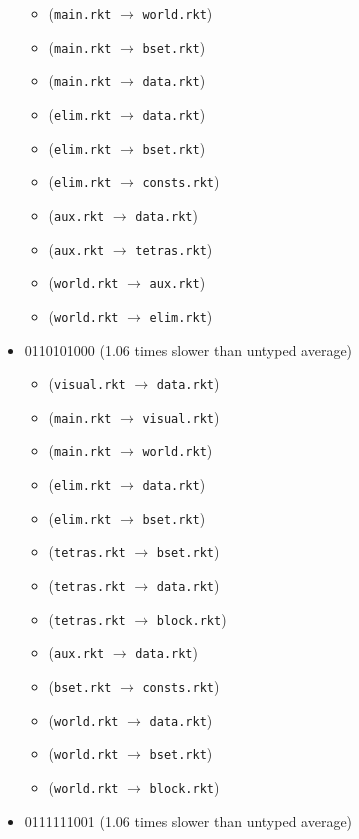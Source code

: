 \documentclass{article}
\newcommand{\mono}[1]{\texttt{#1}}
\begin{document}
\begin{itemize}
\begin{itemize}
  \item (\mono{main.rkt} $\rightarrow$ \mono{world.rkt})
  \item (\mono{main.rkt} $\rightarrow$ \mono{bset.rkt})
  \item (\mono{main.rkt} $\rightarrow$ \mono{data.rkt})
  \item (\mono{elim.rkt} $\rightarrow$ \mono{data.rkt})
  \item (\mono{elim.rkt} $\rightarrow$ \mono{bset.rkt})
  \item (\mono{elim.rkt} $\rightarrow$ \mono{consts.rkt})
  \item (\mono{aux.rkt} $\rightarrow$ \mono{data.rkt})
  \item (\mono{aux.rkt} $\rightarrow$ \mono{tetras.rkt})
  \item (\mono{world.rkt} $\rightarrow$ \mono{aux.rkt})
  \item (\mono{world.rkt} $\rightarrow$ \mono{elim.rkt})
  \end{itemize}
\item 0110101000 (1.06 times slower than untyped average)
  \begin{itemize}
  \item (\mono{visual.rkt} $\rightarrow$ \mono{data.rkt})
  \item (\mono{main.rkt} $\rightarrow$ \mono{visual.rkt})
  \item (\mono{main.rkt} $\rightarrow$ \mono{world.rkt})
  \item (\mono{elim.rkt} $\rightarrow$ \mono{data.rkt})
  \item (\mono{elim.rkt} $\rightarrow$ \mono{bset.rkt})
  \item (\mono{tetras.rkt} $\rightarrow$ \mono{bset.rkt})
  \item (\mono{tetras.rkt} $\rightarrow$ \mono{data.rkt})
  \item (\mono{tetras.rkt} $\rightarrow$ \mono{block.rkt})
  \item (\mono{aux.rkt} $\rightarrow$ \mono{data.rkt})
  \item (\mono{bset.rkt} $\rightarrow$ \mono{consts.rkt})
  \item (\mono{world.rkt} $\rightarrow$ \mono{data.rkt})
  \item (\mono{world.rkt} $\rightarrow$ \mono{bset.rkt})
  \item (\mono{world.rkt} $\rightarrow$ \mono{block.rkt})
  \end{itemize}
\item 0111111001 (1.06 times slower than untyped average)
  \begin{itemize}

\end{itemize}
\end{itemize}
\end{document}
